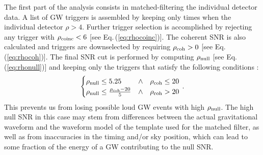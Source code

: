 \documentclass[binding=0.6cm, LaM]{sapthesis}
\begin{document}
	The first part of the analysis consists in matched-filtering the individual detector data.%
	A list of GW triggers is assembled by keeping only times when the individual detector $\rho > 4$.
	Further trigger selection is accomplished by rejecting any trigger with $\rho_{\rm coinc}<6$ [see Eq.\,(\ref{eq:rhocoinc})].
        The coherent SNR is also calculated and triggers are downselected by requiring $\rho_{\rm coh}>0$ [see Eq.\,(\ref{eq:rhocoh})].
	The final SNR cut is performed by computing $\rho_{\rm null}$ [see Eq.\,(\ref{eq:rhonull})] and keeping only the triggers that satisfy the following conditions \cite{46}:
        \begin{equation}
          \begin{cases}
            \rho_{\rm null} \leq 5.25 & \wedge ~~~ \rho_{\rm coh} \leq 20\\
            \rho_{\rm null} \leq {{\rho_{\rm coh}-20}\over {5}} & \wedge ~~~ \rho_{\rm coh} > 20
          \end{cases}\,.
        \end{equation}
	This prevents us from losing possible loud GW events with high $\rho_{\rm null}$.
	The high null SNR in this case may stem from differences between the actual gravitational waveform and the waveform model of the template used for the matched filter, 
	as well as from inaccuracies in the timing and/or sky position, which can lead to some fraction of the energy of a GW contributing to the null SNR. 	
\end{document}
